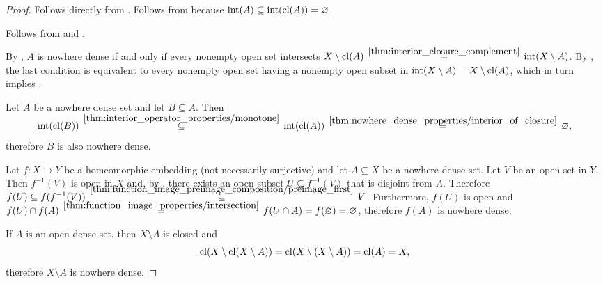 \begin{proof}
   Follows directly from .
   Follows from  because \( \operatorname{int}(A) \subseteq \operatorname{int}(\operatorname{cl}(A)) = \varnothing \).

   Follows from  and .

   By , \( A \) is nowhere dense if and only if every nonempty open set intersects \( X \setminus \cl(A) \reloset {\ref{thm:interior_closure_complement}} = \inter(X \setminus A) \). By , the last condition is equivalent to every nonempty open set having a nonempty open subset in \( \operatorname{int}(X \setminus A) = X \setminus \operatorname{cl}(A) \), which in turn implies .

   Let \( A \) be a nowhere dense set and let \( B \subseteq A \). Then
  \begin{equation*}
    \inter(\cl(B))
    \reloset {\ref{thm:interior_operator_properties/monotone}} \subseteq
    \inter(\cl(A))
    \reloset {\ref{thm:nowhere_dense_properties/interior_of_closure}} =
    \varnothing,
  \end{equation*}
  therefore \( B \) is also nowhere dense.

   Let \( f: X \to Y \) be a homeomorphic embedding (not necessarily surjective) and let \( A \subseteq X \) be a nowhere dense set. Let \( V \) be an open set in \( Y \). Then \( f^{-1}(V) \) is open in \( X \) and, by , there exists an open subset \( U \subseteq f^{-1}(V) \) that is disjoint from \( A \). Therefore \( f(U) \subseteq f(f^{-1}(V)) \reloset {\ref{thm:function_image_preimage_composition/preimage_first}} \subseteq V \). Furthermore, \( f(U) \) is open and \( f(U) \cap f(A) \reloset {\ref{thm:function_image_properties/intersection}} = f(U \cap A) = f(\varnothing) = \varnothing \), therefore \( f(A) \) is nowhere dense.

   If \( A \) is an open dense set, then \( X \setminus A \) is closed and
  \begin{equation*}
    \operatorname{cl}(X \setminus \operatorname{cl}(X \setminus A))
    =
    \operatorname{cl}(X \setminus (X \setminus A))
    =
    \operatorname{cl}(A)
    =
    X,
  \end{equation*}
  therefore \( X \setminus A \) is nowhere dense.
\end{proof}

